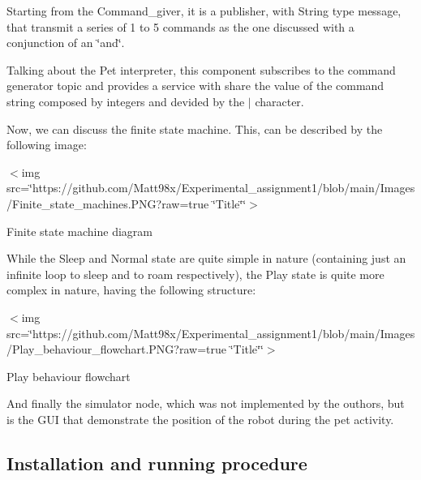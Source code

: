 Starting from the Command\+\_\+giver, it is a publisher, with String type message, that transmit a series of 1 to 5 commands as the one discussed with a conjunction of an \char`\"{}and\char`\"{}.

Talking about the Pet interpreter, this component subscribes to the command generator topic and provides a service with share the value of the command string composed by integers and devided by the \textquotesingle{}$\vert$\textquotesingle{} character.

Now, we can discuss the finite state machine. This, can be described by the following image\+:

$<$img src=\char`\"{}https\+://github.\+com/\+Matt98x/\+Experimental\+\_\+assignment1/blob/main/\+Images/\+Finite\+\_\+state\+\_\+machines.\+P\+N\+G?raw=true \char`\"{}Title\char`\"{}\char`\"{}$>$ 

Finite state machine diagram 

While the \textquotesingle{}Sleep\textquotesingle{} and \textquotesingle{}Normal\textquotesingle{} state are quite simple in nature (containing just an infinite loop to sleep and to roam respectively), the \textquotesingle{}Play\textquotesingle{} state is quite more complex in nature, having the following structure\+: 

$<$img src=\char`\"{}https\+://github.\+com/\+Matt98x/\+Experimental\+\_\+assignment1/blob/main/\+Images/\+Play\+\_\+behaviour\+\_\+flowchart.\+P\+N\+G?raw=true \char`\"{}Title\char`\"{}\char`\"{}$>$ 

Play behaviour flowchart 

And finally the simulator node, which was not implemented by the outhors, but is the G\+UI that demonstrate the position of the robot during the pet activity.

\subsection*{Installation and running procedure}


